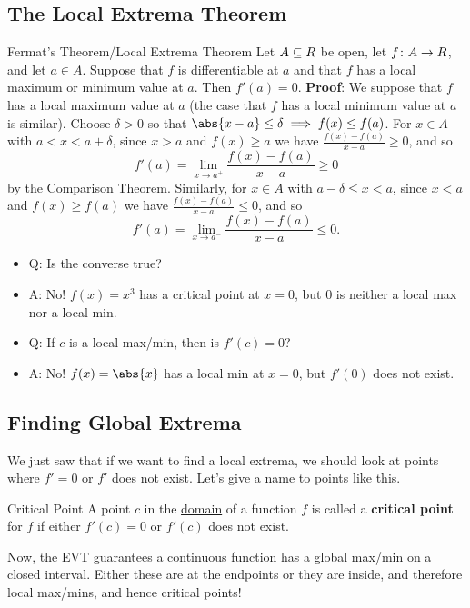 \subsection{The Local Extrema Theorem}
\begin{Theorem}{Fermat's Theorem/Local Extrema Theorem}{}
    Let $ A\subseteq \relax{R} $ be open, let $ f\colon A\to\relax{R} $, and let $ a\in A $. Suppose that $ f $
    is differentiable at $ a $ and that $ f $ has a local maximum or minimum value at $ a $. Then
    $ f'(a)=0 $.
    \tcblower{}
    \textbf{Proof}: We suppose that $ f $ has a local maximum value at $ a $ (the case that $ f $ has a local minimum
    value at $ a $ is similar). Choose $ \delta>0 $ so that $ \abs{x-a}\le \delta\implies f(x)\le f(a) $. For
    $ x\in A $ with $ a<x<a+\delta $, since $ x>a $ and $ f(x)\ge a $ we have $\frac{f(x)-f(a)}{x-a}\ge 0$,
    and so
    \[ f'(a)=\lim\limits_{{x} \to {a^+}}\frac{f(x)-f(a)}{x-a}\ge 0 \]
    by the Comparison Theorem. Similarly, for $ x\in A $ with $ a-\delta\le x<a $, since $ x<a $
    and $ f(x)\ge f(a) $ we have $ \frac{f(x)-f(a)}{x-a}\le 0 $, and so
    \[ f'(a)=\lim\limits_{{x} \to {a^-}}\frac{f(x)-f(a)}{x-a}\le 0. \]
\end{Theorem}
\begin{itemize}
    \item Q\@: Is the converse true?
    \item A\@: No! $ f(x)=x^3 $ has a critical point at $ x=0 $, but $ 0 $ is neither a local max nor a local min.
    \item Q\@: If $ c $ is a local max/min, then is $ f'(c)=0 $?
    \item A\@: No! $ f(x)=\abs{x} $ has a local min at $ x=0 $, but $ f'(0) $ does not exist.
\end{itemize}
\subsection*{Finding Global Extrema}
We just saw that if we want to find a local extrema, we should look at points where $ f'=0 $ or $ f' $ does not exist.
Let's give a name to points like this.
\begin{Definition}{Critical Point}{}
    A point $c$ in the \underline{domain} of a function $f$ is called a \textbf{critical point} for $f$ if either
    $ f'(c)=0 $ or $ f'(c) $ does not exist.
\end{Definition}
Now, the EVT guarantees a continuous function
has a global max/min on a closed interval. Either these are at the endpoints or they are inside, and therefore local max/mins,
and hence critical points!

